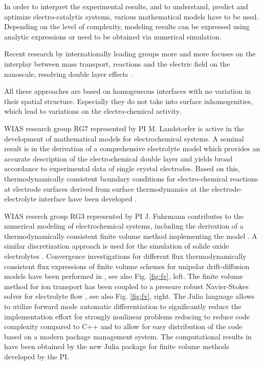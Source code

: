 \documentclass[a4paper,10pt]{article}
\begin{document}

In order to interpret the experimental results, and to understand, predict and optimize electro-catalytic systems, various mathematical models have to be used. Depending on the level of complexity, modeling results can be expressed using analytic expressions or need to be obtained via numerical simulation.

Recent research by internationally leading groups more and more focuses on the interplay between mass transport, reactions and the electric field on the nanoscale, resolving double layer effects \cite{lin2019understanding,tan2018double,eden2019modeling,bohra2019modeling}.

All these approaches are based on homogeneous interfaces with no variation in their spatial structure. Especially they do not take into surface inhomogenities, which lead to variations on the electro-chemical activity.


WIAS research group RG7 represented by PI M. Landstorfer is active in the development of mathematical models for electrochemical systems.  A seminal result is in the derivation of a comprehensive electrolyte model which provides an accurate description of the electrochemical double layer and yields broad accordance to experimental data of single crystal electrodes.
Based on this, thermodynamically consistent boundary conditions for electro-chemical reactions at electrode surfaces derived from surface thermodynamics at the electrode-electrolyte interface have been developed \cite{DGM2013,DGL2014,Landstorfer2016187,landstorfer2017boundary}.

WIAS reserch group RG3 represented by PI J. Fuhrmann contributes to the numerical modeling of electrochemical systems, including the derivation of a thermodynamically consistent finite volume method \cite{JF2016} implementing the model \cite{DGL2014}. A similar discretization approach is used for the simulation of solide oxide electrolytes \cite{VagnerEtAl2019}.
Convergence investigations for different flux thermodynamically consistent flux expressions of finite volume schemes for unipolar drift-diffusion models have been performed in \cite{CCFG2020}, see also Fig. \ref{fig:fv}, left. The finite volume method for ion transport has been coupled to a pressure robust Navier-Stokes solver for electrolyte flow \cite{FGLMMSpringer2019,FuhrmannEtAlECActa2019}, see also Fig. \ref{fig:fv}, right.
The Julia language allows to utilize forward mode automatic differentiation to significantly reduce the implementation effort for strongly nonlinear problems reducing to reduce code complexity compared to C++ and to allow for easy distribution of the code based on a modern package management system.  The computational results in \cite{CCFG2020,VagnerEtAl2019} have been obtained by the new Julia package for finite volume methods \cite{VoronoiFVM} developed by the PI.
\end{document}
